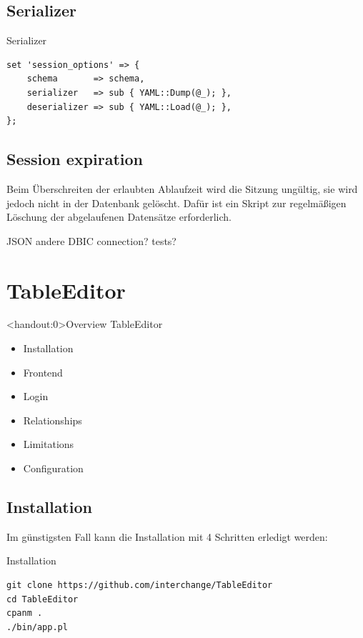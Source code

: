 \subsection{Serializer}
\begin{frame}[fragile]{Serializer}
\begin{lstlisting}
set 'session_options' => {
    schema       => schema,
    serializer   => sub { YAML::Dump(@_); },
    deserializer => sub { YAML::Load(@_); },
};
\end{lstlisting}
\end{frame}

\subsection{Session expiration}

Beim Überschreiten der erlaubten Ablaufzeit wird die Sitzung
ungültig, sie wird jedoch nicht in der Datenbank gelöscht.
Dafür ist ein Skript zur regelmäßigen Löschung der
abgelaufenen Datensätze erforderlich.

JSON
andere DBIC connection?
tests?

\section{TableEditor}

\begin{frame}<handout:0>{Overview TableEditor}
\begin{itemize}
\item Installation
\item Frontend
\item Login
\item Relationships
\item Limitations
\item Configuration
\end{itemize}
\end{frame}

\subsection{Installation}
Im günstigsten Fall kann die Installation mit 4 Schritten
erledigt werden:

\begin{frame}[fragile]{Installation}
\begin{lstlisting}
git clone https://github.com/interchange/TableEditor
cd TableEditor
cpanm .
./bin/app.pl
\end{lstlisting}
\end{frame}

